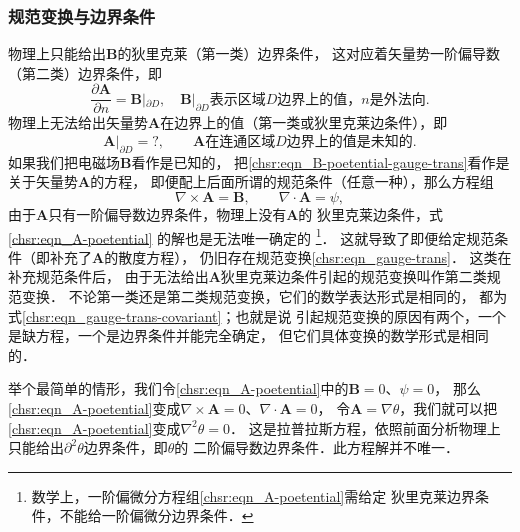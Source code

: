 \subsubsection{规范变换与边界条件}\label{chsr:sec_gauge-bc}
物理上只能给出$\boldsymbol{B}$的狄里克莱（第一类）边界条件，
这对应着矢量势一阶偏导数（第二类）边界条件，即
\begin{equation}
	\frac{\partial \boldsymbol{A}}{\partial n} = \boldsymbol{B} |_{\partial D},
	\quad \boldsymbol{B}|_{\partial D} {\text {表示区域$D$边界上的值，$n$是外法向.}}
\end{equation}
物理上无法给出矢量势$\boldsymbol{A}$在边界上的值（第一类或狄里克莱边条件），即
\begin{equation}
	\boldsymbol{A} |_{\partial D} = ?, \qquad \boldsymbol{A} {\text {在连通区域$D$边界上的值是未知的}.}
\end{equation}
如果我们把电磁场$\boldsymbol{B} $看作是已知的，
把\eqref{chsr:eqn_B-poetential-gauge-trans}看作是关于矢量势$\boldsymbol{A}$的方程，
即便配上后面所谓的规范条件（任意一种），那么方程组
\begin{equation}\label{chsr:eqn_A-poetential}
	\nabla\times \boldsymbol{A}  =\boldsymbol{B},\qquad \nabla\cdot \boldsymbol{A}  =\psi,
\end{equation}
由于$\boldsymbol{A}$只有一阶偏导数边界条件，物理上没有$\boldsymbol{A}$的
狄里克莱边条件，式\eqref{chsr:eqn_A-poetential}
的解也是无法唯一确定的
{\footnote{数学上，一阶偏微分方程组\eqref{chsr:eqn_A-poetential}需给定
		狄里克莱边界条件，不能给一阶偏微分边界条件．}}．
这就导致了即便给定规范条件（即补充了$\boldsymbol{A}$的散度方程），
仍旧存在规范变换\eqref{chsr:eqn_gauge-trans}．
这类在补充规范条件后，
由于无法给出$\boldsymbol{A}$狄里克莱边条件引起的规范变换叫作{\heiti 第二类规范变换}．
不论第一类还是第二类规范变换，它们的数学表达形式是相同的，
都为式\eqref{chsr:eqn_gauge-trans-covariant}；也就是说
引起规范变换的原因有两个，一个是缺方程，一个是边界条件并能完全确定，
但它们具体变换的数学形式是相同的．

举个最简单的情形，我们令\eqref{chsr:eqn_A-poetential}中的$\boldsymbol{B}=0$、$\psi=0$，
那么\eqref{chsr:eqn_A-poetential}变成$\nabla\times \boldsymbol{A}  =0$、$ \nabla\cdot \boldsymbol{A}  =0$，
令$\boldsymbol{A}=\nabla\theta$，我们就可以把\eqref{chsr:eqn_A-poetential}变成$\nabla^2\theta=0$．
这是拉普拉斯方程，依照前面分析物理上只能给出$\partial^2\theta$边界条件，即$\theta$的
二阶偏导数边界条件．此方程解并不唯一．



